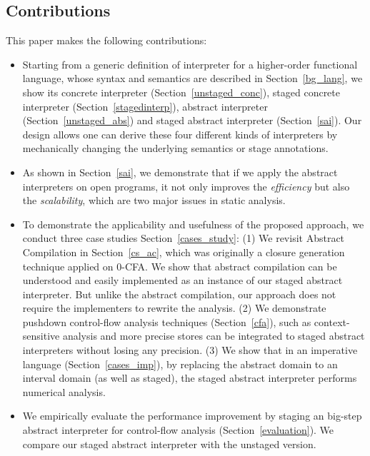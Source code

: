 \iffalse
It has been observed that partially applying context-sensitivity on selected portion of the program could
improve the precision and efficiency \cite{zipper2018, Kastrinis:2013:HCP:2491956.2462191}.
We show that staging abstract interpreters as an approach to effectively implement hybird context-sensitivity\todo{}.
\fi


\subsection{Contributions}

This paper makes the following contributions:

\begin{itemize}
  \item Starting from a generic definition of interpreter for a higher-order functional language,
    whose syntax and semantics are described in Section~\ref{bg_lang}, we show its concrete
    interpreter (Section~\ref{unstaged_conc}), staged concrete interpreter (Section~\ref{stagedinterp}), 
    abstract interpreter (Section~\ref{unstaged_abs}) and staged abstract interpreter (Section~\ref{sai}).
    Our design allows one can derive these four different kinds of interpreters by mechanically changing
    the underlying semantics or stage annotations.
  \item As shown in Section~\ref{sai}, we demonstrate that if we apply the abstract interpreters on open 
    programs, it not only improves the \textit{efficiency} but also the \textit{scalability}, 
    which are two major issues in static analysis.
  \item To demonstrate the applicability and usefulness of the proposed approach, we conduct three case studies 
    Section~\ref{cases_study}: 
    \subitem (1) We revisit Abstract Compilation \cite{Boucher:1996:ACN:647473.727587} in Section~\ref{cs_ac}, 
    which was originally a closure generation technique applied on 0-CFA.
    We show that abstract compilation can be understood and easily implemented as an instance of our staged abstract interpreter.
    But unlike the abstract compilation, our approach does not require the implementers to rewrite the analysis.
    \subitem (2) We demonstrate pushdown control-flow analysis techniques (Section~\ref{cfa}), such as context-sensitive 
    analysis and more precise stores can be integrated to staged abstract interpreters without losing any precision.
    \subitem (3) We show that in an imperative language (Section~\ref{cases_imp}), by replacing the abstract domain
    to an interval domain (as well as staged), the staged abstract interpreter performs numerical analysis.
  \item We empirically evaluate the performance improvement by staging an big-step abstract interpreter 
    for control-flow analysis (Section~\ref{evaluation}). 
    We compare our staged abstract interpreter with the unstaged version.
\end{itemize}
